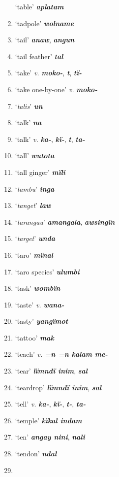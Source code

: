 \begin{enumerate}[noitemsep, label={}, align=left, widest=190, labelsep=1ex,leftmargin=*,itemindent=-10pt]
‘table’ \textbf{\textit{aplatam}} \item
‘tadpole’ \textbf{\textit{wolname}} \item
‘tail’ \textbf{\textit{anaw}}, \textbf{\textit{angun}} \item
‘tail feather’ \textbf{\textit{tal}} \item
‘take’ \textit{v.} \textbf{\textit{moko-}}, \textbf{\textit{t}}, \textbf{\textit{tï-}} \item
‘take one-by-one’ \textit{v.} \textbf{\textit{moko-}} \item
‘\textit{talis}’ \textbf{\textit{un}} \item
‘talk’ \textbf{\textit{na}} \item
‘talk’ \textit{v.} \textbf{\textit{ka-}}, \textbf{\textit{kï-}}, \textbf{\textit{t}}, \textbf{\textit{ta-}} \item
‘tall’ \textbf{\textit{wutota}} \item
‘tall ginger’ \textbf{\textit{mïli}} \item
‘\textit{tambu}’ \textbf{\textit{inga}} \item
‘\textit{tanget}’ \textbf{\textit{law}} \item
‘\textit{tarangau}’ \textbf{\textit{amangala}}, \textbf{\textit{awsingïn}} \item
‘\textit{target}’ \textbf{\textit{unda}} \item
‘taro’ \textbf{\textit{mïnal}} \item
‘taro species’ \textbf{\textit{ulumbi}} \item
‘task’ \textbf{\textit{wombïn}} \item
‘taste’ \textit{v.} \textbf{\textit{wana-}} \item
‘tasty’ \textbf{\textit{yangïmot}} \item
‘tattoo’ \textbf{\textit{mak}} \item
‘teach’ \textit{v.} \textbf{\textit{=n =n kalam me-}} \item
‘tear’ \textbf{\textit{lïmndï inim}}, \textbf{\textit{sal}} \item
‘teardrop’ \textbf{\textit{lïmndï inim}}, \textbf{\textit{sal}} \item
‘tell’ \textit{v.} \textbf{\textit{ka-}}, \textbf{\textit{kï-}}, \textbf{\textit{t-}}, \textbf{\textit{ta-}} \item
‘temple’ \textbf{\textit{kïkal indam}} \item
‘ten’ \textbf{\textit{angay nini}}, \textbf{\textit{nali}} \item
‘tendon’ \textbf{\textit{ndal}} \item

\end{enumerate}

